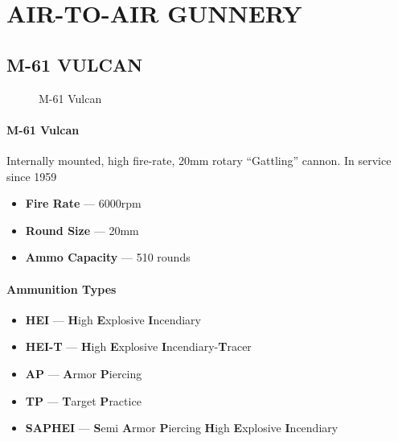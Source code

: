 \section{AIR-TO-AIR GUNNERY}

\subsection{M-61 VULCAN}
\label{subsec:m61}

\begin{figure}[htbp]
    \centering
    \caption{M-61 Vulcan}
\end{figure}

\paragraph{M-61 Vulcan}
Internally mounted, high fire-rate, 20mm rotary ``Gattling'' cannon.
In service since 1959

\begin{itemize}
    \item \textbf{Fire Rate} --- 6000rpm
    \item \textbf{Round Size} --- 20mm
    \item \textbf{Ammo Capacity} --- 510 rounds
\end{itemize}
\paragraph{Ammunition Types}
\begin{itemize}
    \item \textbf{HEI} --- \textbf{H}igh \textbf{E}xplosive \textbf{I}ncendiary
    \item \textbf{HEI-T} --- \textbf{H}igh \textbf{E}xplosive \textbf{I}ncendiary-\textbf{T}racer
    \item \textbf{AP} --- \textbf{A}rmor \textbf{P}iercing
    \item \textbf{TP} --- \textbf{T}arget \textbf{P}ractice
    \item \textbf{SAPHEI} --- \textbf{S}emi \textbf{A}rmor \textbf{P}iercing \textbf{H}igh \textbf{E}xplosive \textbf{I}ncendiary
\end{itemize}
